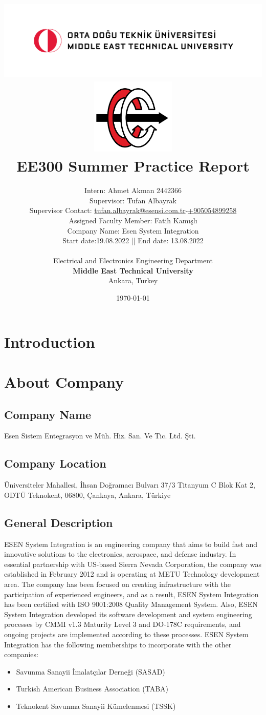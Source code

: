 \documentclass[letterpaper,12pt]{article}
\title{
\includegraphics[width=17cm]{odtu.png} \\
\includegraphics[width=4cm]{eee.png} \\
\vspace*{0.5in}
\textbf{EE300 Summer Practice Report}
\vspace*{0.25in}
}
\author{Intern: Ahmet Akman 2442366\\
Supervisor: Tufan Albayrak\\
Supervisor Contact: \href{mailto:tufan.albayrak@esensi.com.tr}{tufan.albayrak@esensi.com.tr}-\href{tel:+905054899258}{+905054899258}\\
Assigned Faculty Member: Fatih Kamışlı\\
Company Name: Esen System Integration\\
Start date:19.08.2022 || End date: 13.08.2022\\
        \vspace*{0.25in} \\
        Electrical and Electronics Engineering Department\\
        \textbf{Middle East Technical University}\\
        Ankara, Turkey
       } \date{\today}
\begin{document}








\newpage
\tableofcontents
\newpage
\section{Introduction}
\section{About Company}
\subsection{Company Name}
Esen Sistem Entegrasyon ve Müh. Hiz. San. Ve Tic. Ltd. Şti.
\subsection{Company Location}
Üniversiteler Mahallesi, İhsan Doğramacı Bulvarı 37/3 Titanyum C Blok Kat 2, ODTÜ Teknokent, 06800, Çankaya, Ankara, Türkiye
\subsection{General Description}
ESEN System Integration is an engineering company that aims to build fast and
innovative solutions to the electronics, aerospace, and defense industry. In essential partnership with US-based Sierra Nevada Corporation, the company was established in February 2012 and is operating at METU Technology development area. The company has been focused on creating infrastructure with the participation of experienced engineers, and as a result, ESEN System Integration has been certified with ISO 9001:2008 Quality Management System. Also, ESEN System Integration developed its software development and system engineering processes by CMMI v1.3 Maturity Level 3 and DO-178C requirements, and ongoing projects are implemented according to these processes.
ESEN System Integration has the following memberships to incorporate with the other companies:
\begin{itemize}
    \item  Savunma Sanayii İmalatçılar Derneği (SASAD)
    \item Turkish American Business Association (TABA)
    \item Teknokent Savunma Sanayii Kümelenmesi (TSSK)
\end{itemize}
\end{document}
